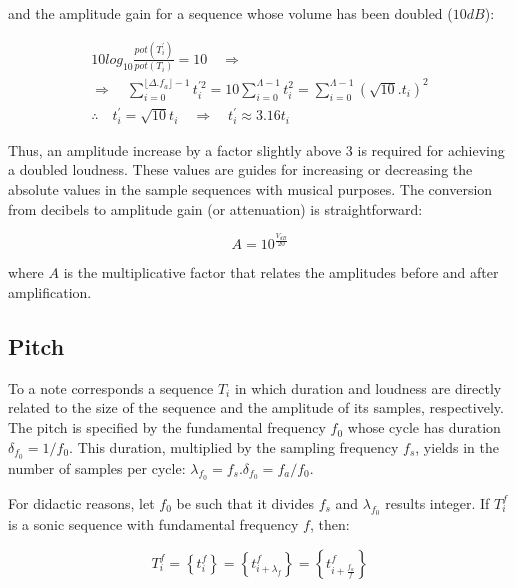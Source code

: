 \noindent and the amplitude gain for a sequence whose volume has been doubled ($10dB$):

\begin{equation}\label{eq:dobraVol}
\begin{split}
10log_{10}\frac{pot(T^{'}_i)}{pot(T_i)} = 10 \quad \Rightarrow \\ \Rightarrow \quad \sum_{i=0}^{\lfloor \Delta.f_a \rfloor -1}t^{'2}_i=10\sum_{i=0}^{\Lambda-1}t_i^2=\sum_{i=0}^{\Lambda-1}(\sqrt{10}.t_i)^2 \\
\therefore \quad t^{'}_i=\sqrt{10}t_i \quad \Rightarrow \quad t^{'}_i \approx 3.16t_i
\end{split}
\end{equation}

Thus, an amplitude increase by a factor slightly above 3 is required for achieving a doubled loudness. These values are guides for increasing or decreasing the absolute values in the sample sequences with musical purposes. The conversion from decibels to amplitude gain (or attenuation) is straightforward:

\begin{equation}\label{ampDec}
A = 10^{\frac{V_{dB}}{20}}
\end{equation}

\noindent where $A$ is the multiplicative factor that relates the amplitudes before and after amplification.

\subsection{Pitch}
To a note corresponds a sequence $T_i$ in which duration and loudness are directly related to the size of the sequence and the amplitude of its samples, respectively. The pitch is specified by the fundamental frequency $f_0$ whose cycle has duration $\delta_{f_0}=1/f_0$. This duration, multiplied by the sampling frequency $f_s$, yields in the number of samples per cycle: $\lambda_{f_0}=f_s . \delta_{f_0} =f_a/f_0$.

For didactic reasons, let $f_0$ be such that it divides $f_s$ and $\lambda_{f_0}$ results integer. If $T_i^f$ is a sonic sequence with fundamental frequency $f$, then:

\begin{equation}\label{periodicidade}
     T^f_i=\left\{ t_i^f \right\}=\left\{ t^f_{i+\lambda_{f}}  \right\}= \left\{ t^f_{i+\frac{f_a}{f}} \right\}
\end{equation}

